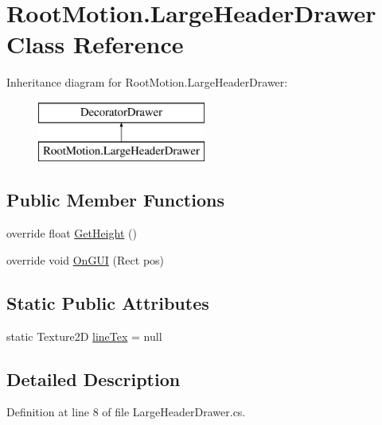 \hypertarget{class_root_motion_1_1_large_header_drawer}{}\section{Root\+Motion.\+Large\+Header\+Drawer Class Reference}
\label{class_root_motion_1_1_large_header_drawer}
Inheritance diagram for Root\+Motion.\+Large\+Header\+Drawer\+:\begin{figure}[H]
\begin{center}
\leavevmode
\includegraphics[height=2.000000cm]{class_root_motion_1_1_large_header_drawer}
\end{center}
\end{figure}
\subsection*{Public Member Functions}
\begin{DoxyCompactItemize}
\item 
override float \mbox{\hyperlink{class_root_motion_1_1_large_header_drawer_a362debdae10a34575d7f3d2d46174382}{Get\+Height}} ()
\item 
override void \mbox{\hyperlink{class_root_motion_1_1_large_header_drawer_adce2e5f9f5f199872193f36f908a450b}{On\+G\+UI}} (Rect pos)
\end{DoxyCompactItemize}
\subsection*{Static Public Attributes}
\begin{DoxyCompactItemize}
\item 
static Texture2D \mbox{\hyperlink{class_root_motion_1_1_large_header_drawer_ad768b6502db6d0f03ea3dec3e5934fd8}{line\+Tex}} = null
\end{DoxyCompactItemize}


\subsection{Detailed Description}


Definition at line 8 of file Large\+Header\+Drawer.\+cs.



